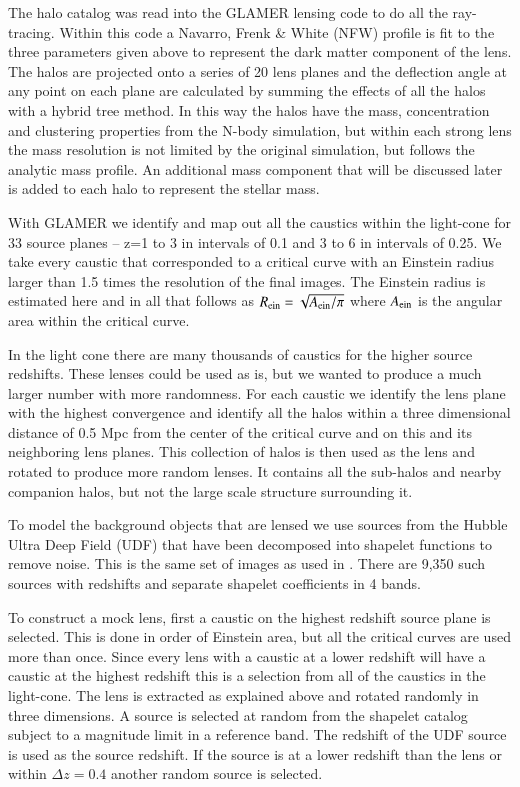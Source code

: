 \documentclass{aa}
\begin{document}
The halo catalog was read into the GLAMER lensing code \citep{2014MNRAS.445.1942M,2014MNRAS.445.1954P} to do all the ray-tracing.    Within this code a Navarro, Frenk \& White (NFW) \citep{1996ApJ...462..563N} profile is fit to the three parameters given above to represent the dark matter component of the lens.  The halos are projected onto a series of 20 lens planes  and the deflection angle at any point on each plane are calculated by summing the effects of all the halos with a hybrid tree method.  In this way the halos have the mass, concentration and clustering properties from the N-body simulation, but within each strong lens the mass resolution is not limited by the original simulation, but follows the analytic mass profile.   An additional mass component that will be discussed later is added to each halo to represent the stellar mass.

With GLAMER we identify and map out all the caustics within the light-cone for 33 source planes -- z=1 to 3 in intervals of 0.1 and 3 to 6 in intervals of 0.25.  We take every caustic that corresponded to a critical curve with an Einstein radius larger than 1.5 times the resolution of the final images.  The Einstein radius is estimated here and in all that follows as $R_{\rm ein}=\sqrt{A_{\rm ein}/\pi}$ where $A_{\rm ein}$ is the angular area within the critical curve.

 In the light cone there are many thousands of caustics for the higher source redshifts.  These lenses could be used as is, but we wanted to produce a much larger number with more randomness.   For each caustic we identify the lens plane with the highest convergence and identify all the halos within a three dimensional distance of 0.5 Mpc from the center of the critical curve and on this and its neighboring lens planes.    This collection of halos is then used as the lens and rotated to produce more random lenses.    It  contains all the sub-halos and nearby companion halos, but not the large scale structure surrounding it.

To model the background objects that are lensed we use sources from
the Hubble Ultra Deep Field (UDF) that have been decomposed into
shapelet functions to remove noise.  This is the same set of images as
used in \citet{2008AandA...482..403M,2010AandA...514A..93M} \citep[see
also][]{2019MNRAS.482.2823P}.   There are 9,350 such sources with redshifts and separate shapelet coefficients in 4 bands.   

To construct a mock lens, first a caustic on the highest redshift source plane is selected.  This is done in order of Einstein area, but all the critical curves are used more than once.  Since every lens with a caustic at a lower redshift will have a caustic at the highest redshift this is a selection from all of the caustics in the light-cone.   The lens is extracted as explained above and rotated randomly in three dimensions.  A source is selected at random from the shapelet catalog subject to a magnitude limit in a reference band.   The redshift of the UDF source is used as the source redshift.  If the source is at a lower redshift than the lens or within $\Delta z = 0.4$ another random source is selected.
\end{document}

